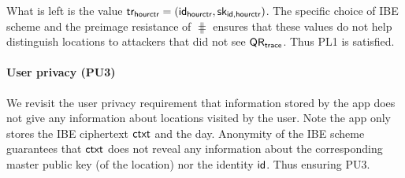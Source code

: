 What is left is the value $\textsf{tr}_{\textsf{hourctr}} = (\textsf{id}_{\textsf{hourctr}}, \textsf{sk}_{\textsf{id},\textsf{hourctr}})$. The specific choice of IBE scheme and the preimage resistance of $\hash$ ensures that these values do not help distinguish locations to attackers that did not see $\textsf{QR}_{\textsf{trace}}$. Thus PL1 is satisfied.

\paragraph{User privacy (PU3)}
We revisit the user privacy requirement that information stored by the app does not give any information about locations visited by the user. Note the app only stores the IBE ciphertext $\textsf{ctxt}$ and the day. Anonymity of the IBE scheme guarantees that $\textsf{ctxt}$ does not reveal any information about the corresponding master public key (of the location) nor the identity $\textsf{id}$. Thus ensuring PU3.
